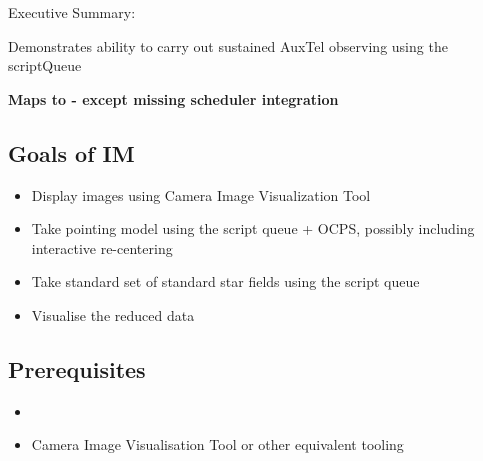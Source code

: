 
Executive Summary:

Demonstrates ability to carry out sustained AuxTel observing using the scriptQueue

\textbf{Maps to  - except missing scheduler integration}

\subsection{Goals of IM}
\label{sec:orgbe41e90}
\begin{itemize}
\item Display images using Camera Image Visualization Tool
\item Take pointing model using the script queue + \gls{OCPS}, possibly including interactive re-centering
\item Take standard set of standard star fields using the script queue
\item Visualise the reduced data
\end{itemize}

\subsection{Prerequisites}

\begin{itemize}
\item{}
\item{Camera Image Visualisation Tool or other equivalent tooling}
\end{itemize}

